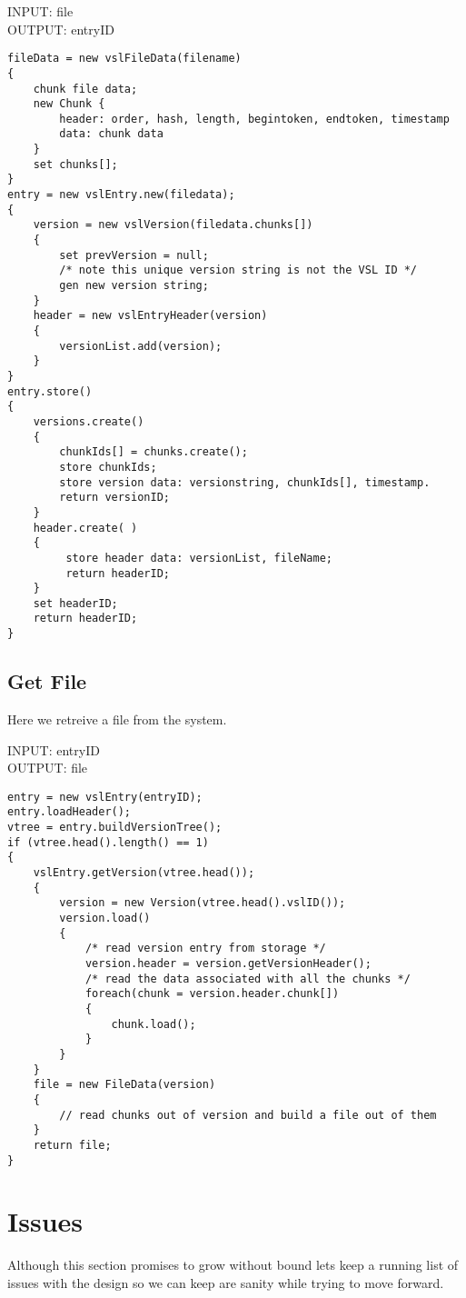 \documentclass[10pt]{article}
\begin{document}
INPUT: file\\
OUTPUT: entryID\\

\begin{verbatim}
fileData = new vslFileData(filename)
{
	chunk file data;
	new Chunk {
		header: order, hash, length, begintoken, endtoken, timestamp	
		data: chunk data
	}
	set chunks[];
}
entry = new vslEntry.new(filedata);
{
	version = new vslVersion(filedata.chunks[])
	{
		set prevVersion = null;
		/* note this unique version string is not the VSL ID */
		gen new version string;
	}
	header = new vslEntryHeader(version)
	{
		versionList.add(version);
	}
}
entry.store()
{
	versions.create()
	{
		chunkIds[] = chunks.create();
		store chunkIds;
		store version data: versionstring, chunkIds[], timestamp.
		return versionID;
	}
	header.create( )
	{
		 store header data: versionList, fileName;
		 return headerID;
	}
	set headerID;
	return headerID;
}
\end{verbatim}



\subsection{Get File}

Here we retreive a file from the system.

INPUT: entryID\\
OUTPUT: file\\

\begin{verbatim}
entry = new vslEntry(entryID);
entry.loadHeader();
vtree = entry.buildVersionTree();
if (vtree.head().length() == 1)
{
	vslEntry.getVersion(vtree.head());
	{
		version = new Version(vtree.head().vslID());
		version.load()
		{
			/* read version entry from storage */
			version.header = version.getVersionHeader();
			/* read the data associated with all the chunks */
			foreach(chunk = version.header.chunk[])
			{
				chunk.load();
			}
		}
	}
	file = new FileData(version)
	{
		// read chunks out of version and build a file out of them
	}
	return file;
}
\end{verbatim}

\section{Issues}

Although this section promises to grow without bound lets keep a running list of issues with the design so we can keep are sanity while trying to move forward.
\end{document}
